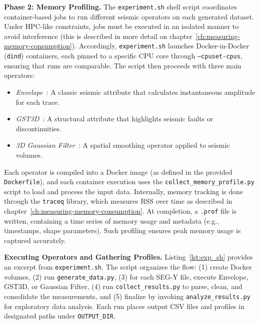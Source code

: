 \vspace{1em}
\noindent
\textbf{Phase 2: Memory Profiling.}
The \texttt{experiment.sh} shell script coordinates container-based jobs to run different seismic operators on each generated dataset.
Under \ac{HPC}-like constraints, jobs must be executed in an isolated manner to avoid interference (this is described in more detail on chapter~\ref{ch:measuring-memory-consumption}).
Accordingly, \texttt{experiment.sh} launches Docker-in-Docker (\texttt{dind}) containers, each pinned to a specific \ac{CPU} core through \texttt{--cpuset-cpus}, ensuring that runs are comparable.
The script then proceeds with three main operators:

\begin{itemize}
    \item \emph{Envelope~\cite{taner1979complex}}: A classic seismic attribute that calculates instantaneous amplitude for each trace.
    \item \emph{\ac{GST3D}~\cite{bigun2004recognition}}: A structural attribute that highlights seismic faults or discontinuities.
    \item \emph{3D Gaussian Filter~\cite{gonzalez2002digital}}: A spatial smoothing operator applied to seismic volumes.
\end{itemize}

Each operator is compiled into a Docker image (as defined in the provided \texttt{Dockerfile}), and each container execution uses the \texttt{collect\_memory\_profile.py} script to load and process the input data.
Internally, memory tracking is done through the \texttt{traceq} library, which measures \ac{RSS} over time as described in chapter~\ref{ch:measuring-memory-consumption}.
At completion, a \texttt{.prof} file is written, containing a time series of memory usage and metadata (e.g., timestamps, shape parameters).
Such profiling ensures peak memory usage is captured accurately.

\vspace{1em}
\noindent
\textbf{Executing Operators and Gathering Profiles.}
Listing~\ref{lst:exp_sh} provides an excerpt from \texttt{experiment.sh}.
The script organizes the flow:
(1) create Docker volumes,
(2) run \texttt{generate\_data.py},
(3) for each SEG-Y file, execute Envelope, \ac{GST3D}, or Gaussian Filter,
(4) run \texttt{collect\_results.py} to parse, clean, and consolidate the measurements, and
(5) finalize by invoking \texttt{analyze\_results.py} for exploratory data analysis.
Each run places output CSV files and profiles in designated paths under \texttt{OUTPUT\_DIR}.

